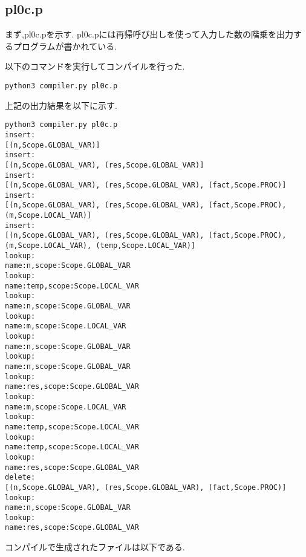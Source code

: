 \documentclass[main]{subfiles}
\begin{document}
\subsection{pl0c.p}
まず,pl0c.pを示す.
pl0c.pには再帰呼び出しを使って入力した数の階乗を出力するプログラムが書かれている.

以下のコマンドを実行してコンパイルを行った.
\begin{oframed}
\begin{verbatim}
python3 compiler.py pl0c.p
\end{verbatim}
\end{oframed}
上記の出力結果を以下に示す.
\begin{lstlisting}[caption=python3 compiler.py pl0c.pの出力]
python3 compiler.py pl0c.p
insert:
[(n,Scope.GLOBAL_VAR)]
insert:
[(n,Scope.GLOBAL_VAR), (res,Scope.GLOBAL_VAR)]
insert:
[(n,Scope.GLOBAL_VAR), (res,Scope.GLOBAL_VAR), (fact,Scope.PROC)]
insert:
[(n,Scope.GLOBAL_VAR), (res,Scope.GLOBAL_VAR), (fact,Scope.PROC), (m,Scope.LOCAL_VAR)]
insert:
[(n,Scope.GLOBAL_VAR), (res,Scope.GLOBAL_VAR), (fact,Scope.PROC), (m,Scope.LOCAL_VAR), (temp,Scope.LOCAL_VAR)]
lookup:
name:n,scope:Scope.GLOBAL_VAR
lookup:
name:temp,scope:Scope.LOCAL_VAR
lookup:
name:n,scope:Scope.GLOBAL_VAR
lookup:
name:m,scope:Scope.LOCAL_VAR
lookup:
name:n,scope:Scope.GLOBAL_VAR
lookup:
name:n,scope:Scope.GLOBAL_VAR
lookup:
name:res,scope:Scope.GLOBAL_VAR
lookup:
name:m,scope:Scope.LOCAL_VAR
lookup:
name:temp,scope:Scope.LOCAL_VAR
lookup:
name:temp,scope:Scope.LOCAL_VAR
lookup:
name:res,scope:Scope.GLOBAL_VAR
delete:
[(n,Scope.GLOBAL_VAR), (res,Scope.GLOBAL_VAR), (fact,Scope.PROC)]
lookup:
name:n,scope:Scope.GLOBAL_VAR
lookup:
name:res,scope:Scope.GLOBAL_VAR
\end{lstlisting}
コンパイルで生成されたファイルは以下である.
\end{document}
